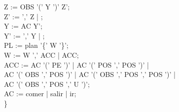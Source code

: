 \documentclass[11pt,a4paper,spanish,twoside]{book}
\theoremstyle{plain} \newtheorem{nota}{Nota}
\begin{document}
\begin{tabbing}
\> Z   := OBS '(' Y ')' Z';\\
\> Z'  := ',' Z | ;\\
\> Y   := AC Y';\\
\> Y'  := ',' Y | ;\\
\> PL  := plan '\{' W '\}';\\
\> W   := W ',' ACC | ACC;\\
\> ACC := AC '(' PE ')' | AC '(' POS ',' POS ')' |\\
\> AC '(' OBS ',' POS ')' | AC '(' OBS ',' POS ',' POS ')' |\\
\> AC '(' OBS ',' POS ',' U ')';\\
\> AC  :=  comer | salir | ir;\\
\}\\
\end{tabbing}
\end{document}
